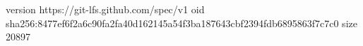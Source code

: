 version https://git-lfs.github.com/spec/v1
oid sha256:8477ef6f2a6c90fa2fa40d162145a54f3ba187643cbf2394fdb6895863f7c7c0
size 20897
